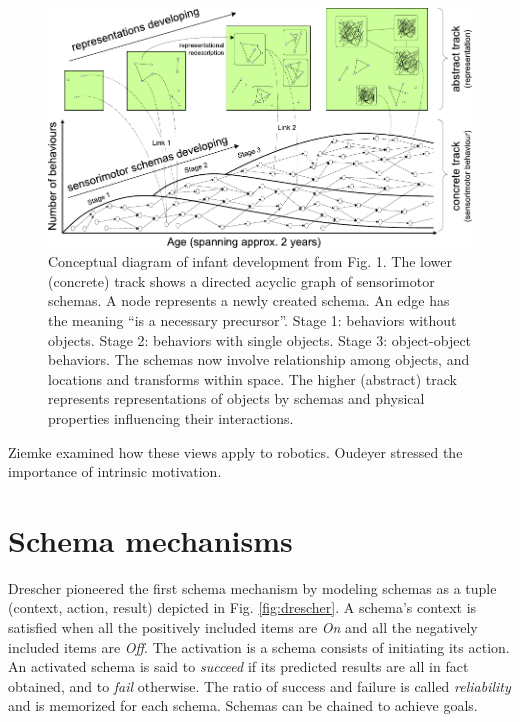\documentclass[runningheads]{llncs}
\begin{document}
\begin{figure}
	\includegraphics[width=\textwidth]{Figure_1_guerin.pdf}
	\caption{Conceptual diagram of infant development from \cite{guerin_survey_2013} Fig. 1.
	The lower (concrete) track shows a directed acyclic graph of sensorimotor schemas. 
	A node represents a newly created schema. 
	An edge has the meaning ``is a necessary precursor''. 
    Stage 1: behaviors without objects. 
    Stage 2: behaviors with single objects. 
    Stage 3: object-object behaviors. The schemas now involve relationship among objects, and locations and transforms within space.
    The higher (abstract) track represents representations of objects by schemas and physical properties influencing their interactions.} 
	\label{fig:general}
\end{figure}

Ziemke \cite{ziemke_construction_2001} examined how these views apply to robotics.
Oudeyer \cite{oudeyer_intrinsic_2007} stressed the importance of intrinsic motivation. 


\section{Schema mechanisms}

Drescher \cite{drescher_made-up_1991} pioneered the first schema mechanism by modeling schemas as a tuple (context, action, result) depicted in Fig. \ref{fig:drescher}. 
A schema's context is satisfied when all the positively included items are \textit{On} and all the negatively included items are \textit{Off}. 
The activation is a schema consists of initiating its action. An activated schema is said to \textit{succeed} if its predicted results are all in fact obtained, and to \textit{fail} otherwise. The ratio of success and failure is called \textit{reliability} and is memorized for each schema.  
Schemas can be chained to achieve goals. 
\end{document}

